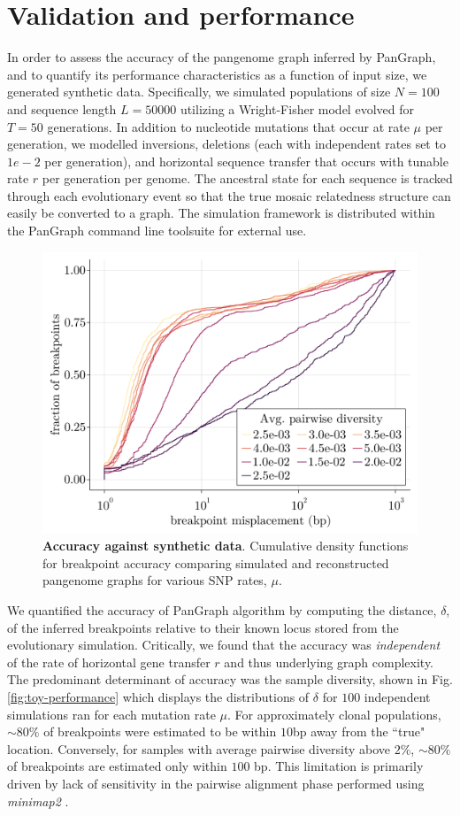\documentclass[aps,rmp,reprint,superscriptaddress,notitlepage,10pt]{revtex4-1}
\begin{document}
\section{Validation and performance}
In order to assess the accuracy of the pangenome graph inferred by PanGraph, and to quantify its performance characteristics as a function of input size, we generated synthetic data.
Specifically, we simulated populations of size $N=100$ and sequence length $L=50000$ utilizing a Wright-Fisher model \cite{hudson2002generating} evolved for $T=50$ generations.
In addition to nucleotide mutations that occur at rate $\mu$ per generation, we modelled inversions, deletions (each with independent rates set to $1e-2$ per generation), and horizontal sequence transfer that occurs with tunable rate $r$ per generation per genome.
The ancestral state for each sequence is tracked through each evolutionary event so that the true mosaic relatedness structure can easily be converted to a graph.
The simulation framework is distributed within the PanGraph command line toolsuite for external use.

\begin{figure}[htb]
    \includegraphics[width=.5\textwidth]{paper-accuracy-20.png}
    \caption{{\bf Accuracy against synthetic data}. Cumulative density functions for breakpoint accuracy comparing simulated and reconstructed pangenome graphs for various SNP rates, $\mu$.}
    \label{fig:toy-accuracy}
\end{figure}

We quantified the accuracy of PanGraph algorithm by computing the distance, $\delta$, of the inferred breakpoints relative to their known locus stored from the evolutionary simulation.
Critically, we found that the accuracy was \emph{independent} of the rate of horizontal gene transfer $r$ and thus underlying graph complexity.
The predominant determinant of accuracy was the sample diversity, shown in Fig. \ref{fig:toy-performance} which displays the distributions of $\delta$ for $100$ independent simulations ran for each mutation rate $\mu$.
For approximately clonal populations, $\sim 80\%$ of breakpoints were estimated to be within $10$bp away from the ``true" location.
Conversely, for samples with average pairwise diversity above $2\%$, $\sim 80\%$ of breakpoints are estimated only within $100$ bp.
This limitation is primarily driven by lack of sensitivity in the pairwise alignment phase performed using \emph{minimap2} \cite{li2018minimap2}.
\end{document}

